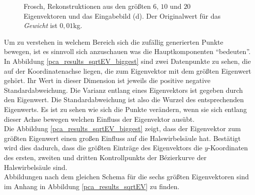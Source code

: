 \begin{figure}
  \caption{Frosch, Rekonstruktionen aus den größten $6$, $10$ und $20$ Eigenvektoren und das Eingabebild (d). Der Originalwert für das \emph{Gewicht} ist $0{,}01$kg.}
  \label{frosch}
 \end{figure}
 
 
 Um zu verstehen in welchem Bereich sich die zufällig generierten Punkte bewegen, ist es sinnvoll sich anzuschauen was die Hauptkomponenten "`bedeuten"'. In Abbildung \ref{pca_results_sqrtEV_biggest} sind zwei Datenpunkte zu sehen, die auf der Koordinatenachse liegen, die zum Eigenvektor mit dem größten Eigenwert gehört. Ihr Wert in dieser Dimension ist jeweils die positive \bzw negative Standardabweichung. Die Varianz entlang eines Eigenvektors ist gegeben durch den Eigenwert. Die Standardabweichung ist also die Wurzel des entsprechenden Eigenwerts. Es ist zu sehen wie sich die Punkte verändern, wenn sie sich entlang dieser Achse bewegen \bzw welchen Einfluss der Eigenvektor ausübt.\\
 Die Abbildung \ref{pca_results_sqrtEV_biggest} zeigt, dass der Eigenvektor zum größten Eigenwert einen großen Einfluss auf die Halswirbelsäule hat. Bestätigt wird dies dadurch, dass die größten Einträge des Eigenvektors die $y$-Koordinaten des ersten, zweiten und dritten Kontrollpunkts der Bézierkurve der Halswirbelsäule sind.\\
 Abbildungen nach dem gleichen Schema für die sechs größten Eigenvektoren sind im Anhang in Abbildung \ref{pca_results_sqrtEV} zu finden.
 
